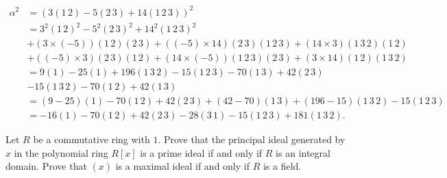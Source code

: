 \documentclass[12 pt, letterpaper]{hmcpset}
\begin{document}
\begin{solution}
\begin{enumerate}
			\[
				\begin{split}
					\alpha^{2} & = (3 (1 \, 2) - 5 (2 \, 3) + 14 (1 \, 2 \, 3))^{2} \\
						   & = 3^{2} (1 \, 2)^{2} - 5^{2} (2 \, 3)^{2} + 14^{2} (1 \, 2 \, 3)^{2} \\ 
						   & + (3 \times (-5))(1 \, 2)(2 \, 3) + ((-5) \times 14) (2 \, 3) (1 \, 2 \, 3) + (14 \times 3) (1 \, 3 \, 2)(1 \, 2) \\
						   & + ((-5) \times 3)(2 \, 3)(1 \, 2) + (14 \times (-5))(1 \, 2 \, 3)(2 \, 3) + (3 \times 14)(1 \, 2)(1 \, 3 \, 2) \\
						   & = 9 (1) - 25 (1) + 196 (1 \, 3 \, 2) - 15 (1 \, 2 \, 3) - 70 (1 \, 3) + 42 (2 \, 3) \\
						   & - 15 (1 \, 3 \, 2) - 70 (1 \, 2) + 42 (1 \, 3) \\
						   & = (9 - 25) (1) - 70 (1 \, 2) + 42(2 \, 3) + (42 - 70) (1 \, 3) + (196 - 15)(1 \, 3 \, 2) - 15 (1 \, 2 \, 3) \\
						   & = -16 (1) - 70 (1 \, 2) + 42 (2 \, 3) - 28 (3 \, 1) -15 (1 \, 2 \, 3) + 181 (1 \, 3 \, 2).
				\end{split}
			\]
	\end{enumerate}
\end{solution}

\pagebreak

\begin{problem}
	Let $R$ be a commutative ring with $1$. Prove that the principal ideal generated by $x$ in the polynomial ring $R[x]$ is a prime ideal if and only if $R$ is an integral domain. Prove that $(x)$ is a maximal ideal if and only if $R$ is a field.
\end{problem}
\end{document}
